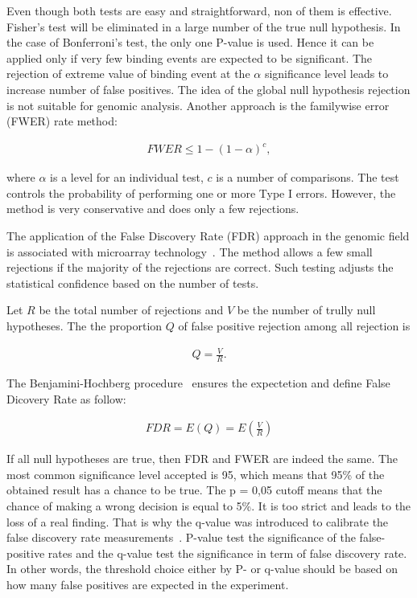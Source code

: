 Even though both tests are easy and straightforward, non of them is effective. 
Fisher's test will be eliminated in a large number of the true null hypothesis. 
In the case of  Bonferroni's test, the only one P-value is used. 
Hence it can be applied only if very few binding events are expected to be significant. 
The rejection of extreme value of binding event at the $\alpha$ significance level leads to increase number of false positives. 
The idea of the global null hypothesis rejection is not suitable for genomic analysis. 
Another approach is the familywise error (FWER) rate method:

\begin{align*}
    FWER \leq 1 - (1 - \alpha)^c, 
\end{align*}

where $\alpha$ is a level for an individual test, $c$ is a number of comparisons.
The test controls the probability of performing one or more Type I errors. 
However, the method is very conservative and does only a few rejections. 

The application of the False Discovery Rate (FDR) approach in the genomic field is associated with microarray technology~\cite{lai2017statistical}.
The method allows a few small rejections if the majority of the rejections are correct. Such testing adjusts the statistical confidence based on the number of tests. 

Let $R$ be the total number of rejections and $V$ be the number of trully null hypotheses.
The the proportion $Q$ of false positive rejection among all rejection is 

\begin{align*}
    Q = \frac{V}{R}.
\end{align*}

The Benjamini-Hochberg procedure~\cite{benjamini2000adaptive} ensures the expectetion and define False Dicovery Rate as follow: 

\begin{align*}
    FDR = E(Q) = E \left(\frac{V}{R}\right)
\end{align*}

If all null hypotheses are true, then FDR and FWER are indeed the same.
The most common significance level accepted is 95, which means that 95\% of the obtained result has a chance to be true. 
The p = 0,05 cutoff means that the chance of making a wrong decision is equal to 5\%. 
It is too strict and leads to the loss of a real finding. 
That is why the q-value was introduced to calibrate the false discovery rate measurements~\cite{storey2003statistical}. 
P-value test the significance of the false-positive rates and the q-value test the significance in term of false discovery rate. 
In other words, the threshold choice either by P- or q-value should be based on how many false positives are expected in the experiment.



